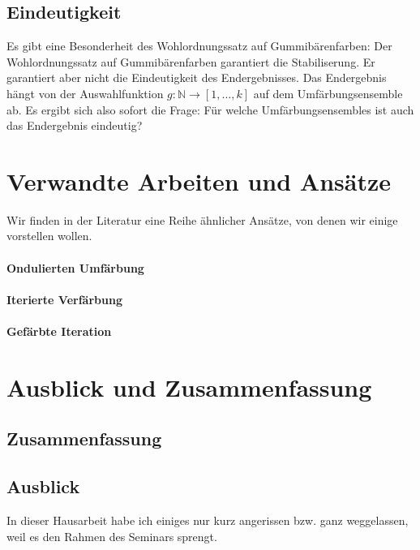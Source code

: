 \documentclass[11pt]{scrartcl}
\theoremstyle{plain}
\theoremstyle{definition}
\theoremstyle{remark}
\begin{document}
\subsection{Eindeutigkeit}
Es gibt eine Besonderheit des Wohlordnungssatz auf Gummibärenfarben:
Der Wohlordnungssatz auf Gummibärenfarben garantiert die
Stabiliserung.  Er garantiert aber nicht die Eindeutigkeit des
Endergebnisses.  Das Endergebnis hängt von der Auswahlfunktion $g:
\mathbb{N} \to [1, \ldots, k]$ auf dem Umfärbungsensemble ab.  Es
ergibt sich also sofort die Frage: Für welche Umfärbungsensembles ist
auch das Endergebnis eindeutig?





\section{Verwandte Arbeiten und Ansätze}
Wir finden in der Literatur eine Reihe ähnlicher Ansätze, von denen
wir einige vorstellen wollen.

\paragraph{Ondulierten Umfärbung}
\paragraph{Iterierte Verfärbung}
\paragraph{Gefärbte Iteration}





\section{Ausblick und Zusammenfassung}



\subsection{ Zusammenfassung}



\subsection{Ausblick}
In dieser Hausarbeit habe ich einiges nur kurz angerissen bzw. ganz
weggelassen, weil es den Rahmen des Seminars sprengt.
\end{document}
